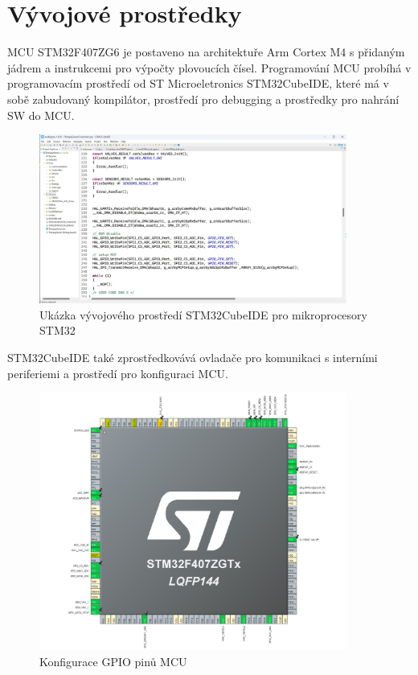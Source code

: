 \section{Vývojové prostředky}
MCU STM32F407ZG6 je postaveno na architektuře Arm Cortex M4 s přidaným jádrem a instrukcemi pro výpočty plovoucích čísel.
Programování MCU probíhá v programovacím prostředí od ST Microeletronics STM32CubeIDE, které má v sobě zabudovaný kompilátor, prostředí pro debugging a prostředky pro nahrání SW do MCU.
\begin{figure}[H]
    \caption{Ukázka vývojového prostředí STM32CubeIDE pro mikroprocesory STM32}
    \includegraphics[width=0.9\textwidth]{pictures/cubeide.jpg}
\end{figure}
STM32CubeIDE také zprostředkovává ovladače pro komunikaci s interními periferiemi a prostředí pro konfiguraci MCU.
\begin{figure}[H]
    \caption{Konfigurace GPIO pinů MCU}
    \includegraphics[width=0.9\textwidth]{pictures/mcu_settings.jpg}
\end{figure}
